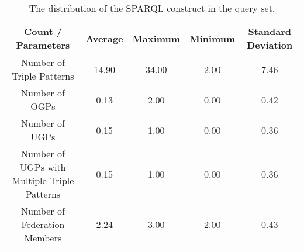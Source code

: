 \begin{table}
    \begin{center}
        \begin{tabular}{|*{5}{c|}}
        \hline
        Count / Parameters & Average & Maximum & Minimum & Standard Deviation \\ 
        \hline \hline
        Number of Triple Patterns & 14.90 & 34.00 & 2.00 & 7.46 \\ 
        \hline
        Number of OGPs & 0.13 & 2.00 & 0.00 & 0.42 \\ 
        \hline
        Number of UGPs & 0.15 & 1.00 & 0.00 & 0.36 \\ 
        \hline
        Number of UGPs with Multiple Triple Patterns & 0.15 & 1.00 & 0.00 & 0.36 \\ 
        \hline
        Number of Federation Members & 2.24 & 3.00 & 2.00 & 0.43 \\  
        \hline
        \end{tabular}
    \end{center}
    \caption{
        The distribution of the SPARQL construct in the query set.
    }
    \label{tab:statQuery}
\end{table}